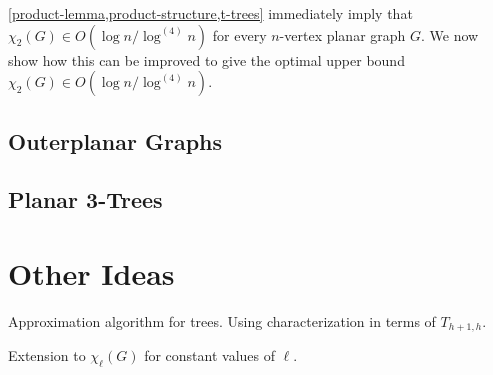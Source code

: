 \documentclass[kpfonts]{patmorin}
\newcommand{\uqs}{\chi_2}
\theoremstyle{named}
\begin{document}
\cref{product-lemma,product-structure,t-trees} immediately imply that $\uqs(G)\in O(\log n/\log^{(4)} n)$ for every $n$-vertex planar graph $G$.  We now show how this can be improved to give the optimal upper bound
$\uqs(G)\in O(\log n/\log^{(4)} n)$.

\subsection{Outerplanar Graphs}


\subsection{Planar 3-Trees}


\section{Other Ideas}

Approximation algorithm for trees.  Using characterization in terms of $T_{h+1,h}$.

Extension to $\chi_\ell(G)$ for constant values of $\ell$.




\end{document}
